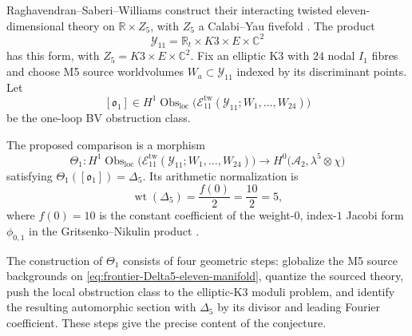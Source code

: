 \begin{remark}
\label{rem:frontier-Delta5-onel-loop-11d-K3T2}
\ClaimStatusConjectured
{}
Raghavendran--Saberi--Williams construct their interacting twisted
eleven-dimensional theory on $\mathbb R\times Z_5$, with $Z_5$ a
Calabi--Yau fivefold \cite{RSW23}.  The product
\begin{equation}\label{eq:frontier-Delta5-eleven-manifold}
 \mathcal Y_{11}
 =\mathbb R_t\times K3\times E\times\mathbb C^2
\end{equation}
has this form, with $Z_5=K3\times E\times\mathbb C^2$.  Fix an
elliptic K3 with $24$ nodal $I_1$ fibres and choose M5 source
worldvolumes $W_a\subset\mathcal Y_{11}$ indexed by its discriminant
points.  Let
\[
 [\mathfrak o_1]\in
 H^1\operatorname{Obs}_{\mathrm{loc}}
 \bigl(\mathcal E_{11}^{\mathrm{tw}}
       (\mathcal Y_{11};W_1,\ldots,W_{24})\bigr)
\]
be the one-loop BV obstruction class.

The proposed comparison is a morphism
\[
 \Theta_1:
 H^1\operatorname{Obs}_{\mathrm{loc}}
 \bigl(\mathcal E_{11}^{\mathrm{tw}}
       (\mathcal Y_{11};W_1,\ldots,W_{24})\bigr)
 \longrightarrow
 H^0\bigl(\mathcal A_2,\lambda^5\otimes\chi\bigr)
\]
satisfying $\Theta_1([\mathfrak o_1])=\Delta _5$.  Its arithmetic
normalization is
\begin{equation}\label{eq:frontier-Delta5-weight-decomposition}
 \operatorname{wt}(\Delta _5)=\frac{f(0)}2
 =\frac{10}{2}=5,
\end{equation}
where $f(0)=10$ is the constant coefficient of the weight-$0$,
index-$1$ Jacobi form $\phi_{0,1}$ in the Gritsenko--Nikulin product
\cite[eqs.~(1.8)--(1.10)]{GN96Igusa}.

The construction of $\Theta_1$ consists of four geometric steps:
globalize the M5 source backgrounds on
\eqref{eq:frontier-Delta5-eleven-manifold}, quantize the sourced theory,
push the local obstruction class to the elliptic-K3 moduli problem,
and identify the resulting automorphic section with $\Delta _5$ by
its divisor and leading Fourier coefficient.  These steps give the
precise content of the conjecture.
\end{remark}

